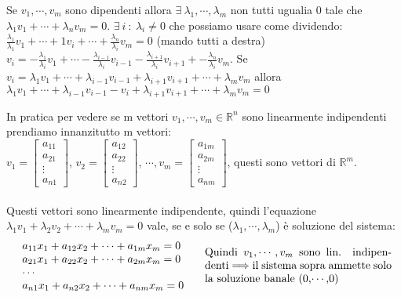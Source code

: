 \begin{demostration}
Se $v_1, \cdots, v_m$ sono dipendenti allora $\exists \: \lambda_1, \cdots, \lambda_m$ non tutti ugualia 0 tale che $\lambda_1 v_1 + \cdots + \lambda_n v_m = 0$. $\exists \: i \: : \: \lambda_i \neq 0$ che possiamo usare come dividendo: $\frac{\lambda_1}{\lambda_1} v_1 + \cdots + 1v_i + \cdots + \frac{\lambda_n}{\lambda_i} v_m = 0$
(mando tutti a destra) $v_i = -\frac{\lambda_1}{\lambda_i} v_1 + \cdots - \frac{\lambda_{i-1}}{\lambda_i}v_{i-1} - \frac{\lambda_{i+1}}{\lambda_i}v_{i+1} + -\frac{\lambda_n}{\lambda_i} v_m$.
Se $v_i = \lambda_1 v_1 + \cdots + \lambda_{i-1}v_{i-1} + \lambda_{i+1}v_{i+1} + \cdots + \lambda_m v_m$ allora $ \lambda_1 v_1 + \cdots + \lambda_{i-1}v_{i-1} - v_i + \lambda_{i+1}v_{i+1} + \cdots + \lambda_m v_m = 0$
\end{demostration}
\hspace{-15pt}In pratica per vedere se m vettori $v_1, \cdots, v_m \in \mathbb{R}^n$ sono linearmente indipendenti prendiamo innanzitutto m vettori:\\
$v_1 = \begin{bmatrix}a_11 \\ a_21 \\ \vdots \\ a_{n1}\end{bmatrix}$, $v_2 = \begin{bmatrix}a_{12}\\a_{22}\\\vdots\\ a_{n2}\end{bmatrix}$, $\cdots, v_m = \begin{bmatrix}a_{1m}\\a_{2m}\\\vdots\\ a_{nm}\end{bmatrix}$, questi sono vettori di $\mathbb{R}^m$.\\\\
Questi vettori sono linearmente indipendente, quindi l'equazione $\lambda_1v_1 + \lambda_2 v_2 + \cdots + \lambda_mv_m = 0$ vale, se e solo se ($\lambda_1, \cdots, \lambda_m$) è soluzione del sistema:
\[
\begin{array}{l}
     a_{11}x_1 + a_{12}x_2 + \cdots + a_{1m}x_m = 0\\
     a_{21}x_1 + a_{22}x_2 + \cdots + a_{2m}x_m = 0\\
     \cdots\\
     a_{n1}x_1 + a_{n2}x_2 + \cdots + a_{nm}x_m = 0\\
\end{array}
\hspace{.5cm}
\parbox{6cm}{Quindi $v_1, \cdots, v_m$ sono lin. indipendenti $\Longrightarrow$ il sistema sopra ammette solo la soluzione banale (0,$\cdots$,0)}
\]

